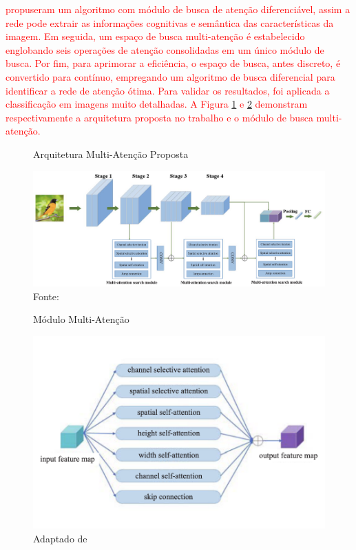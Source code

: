 \textcolor{red}{
 propuseram um algoritmo com módulo de busca de atenção diferenciável, assim a rede pode extrair as informações cognitivas e semântica das características da imagem. Em seguida, um espaço de busca multi-atenção é estabelecido englobando seis operações de atenção consolidadas em um único módulo de busca. Por fim, para aprimorar a eficiência, o espaço de busca, antes discreto, é convertido para contínuo, empregando um algoritmo de busca diferencial para identificar a rede de atenção ótima. Para validar os resultados, foi aplicada a classificação em imagens  muito detalhadas. A Figura \ref{fig:fig022} e \ref{fig:fig023} demonstram respectivamente a arquitetura proposta no trabalho e o módulo de busca multi-atenção.
}
\newline

\begin{figure}[htbp]
    \centering
    \caption{Arquitetura Multi-Atenção Proposta}
    \includegraphics[width=1\textwidth]{figures/fig022.png}
    \caption*{Fonte: \cite{yangNeuralNetworkDesign2024a}}
    \label{fig:fig022}
\end{figure}

\begin{figure}[htbp]
    \centering
    \caption{Módulo Multi-Atenção}
    \includegraphics[width=1\textwidth]{figures/fig023.png}
    \caption*{Adaptado de \cite{yangNeuralNetworkDesign2024a}}
    \label{fig:fig023}
\end{figure}
